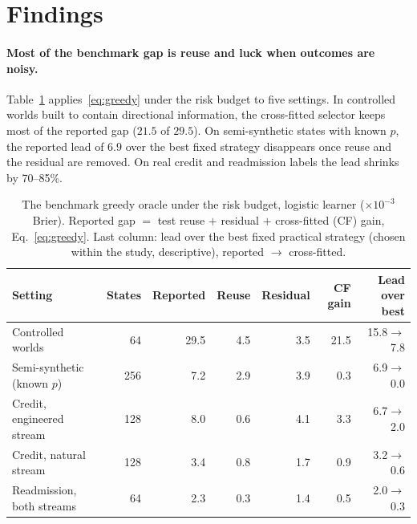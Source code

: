 \documentclass[runningheads]{llncs}
\begin{document}
\section{Findings}
\label{sec:findings}
\paragraph{Most of the benchmark gap is reuse and luck when outcomes are noisy.} Table~\ref{tab:known} applies~\eqref{eq:greedy} under the risk budget to five settings. In controlled worlds built to contain directional information, the cross-fitted selector keeps most of the reported gap ($21.5$ of $29.5$). On semi-synthetic states with known $p$, the reported lead of $6.9$ over the best fixed strategy disappears once reuse and the residual are removed. On real credit and readmission labels the lead shrinks by 70--85\%.

\begin{table}[t]
\caption{The benchmark greedy oracle under the risk budget, logistic learner ($\times10^{-3}$ Brier). Reported gap $=$ test reuse $+$ residual $+$ cross-fitted (CF) gain, Eq.~\eqref{eq:greedy}. Last column: lead over the best fixed practical strategy (chosen within the study, descriptive), reported $\to$ cross-fitted.}
\label{tab:known}
\centering\scriptsize
\setlength{\tabcolsep}{3.5pt}
\begin{tabular}{lrrrrrr}
\toprule
Setting & States & Reported & Reuse & Residual & CF gain & Lead over best \\
\midrule
Controlled worlds & 64 & 29.5 & 4.5 & 3.5 & 21.5 & 15.8$\to$7.8 \\
Semi-synthetic (known $p$) & 256 & 7.2 & 2.9 & 3.9 & 0.3 & 6.9$\to$0.0 \\
Credit, engineered stream & 128 & 8.0 & 0.6 & 4.1 & 3.3 & 6.7$\to$2.0 \\
Credit, natural stream & 128 & 3.4 & 0.8 & 1.7 & 0.9 & 3.2$\to$0.6 \\
Readmission, both streams & 64 & 2.3 & 0.3 & 1.4 & 0.5 & 2.0$\to$0.3 \\
\bottomrule
\end{tabular}
\end{table}
\end{document}
